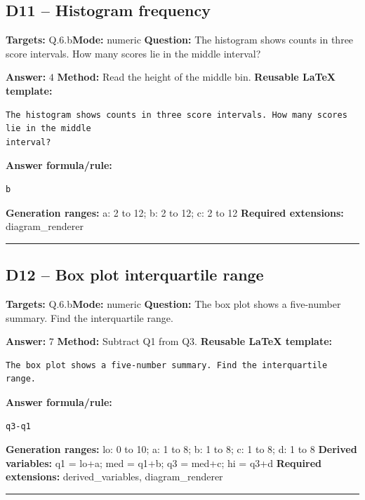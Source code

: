 \documentclass[11pt]{article}
\begin{document}
\subsection{D11 -- Histogram frequency}
\textbf{Targets:} Q.6.b\quad\textbf{Mode:} numeric
\textbf{Question:} The histogram shows counts in three score intervals. How many scores lie in the middle interval?
\begin{center}\end{center}
\textbf{Answer:} \(4\)
\textbf{Method:} Read the height of the middle bin.
\textbf{Reusable LaTeX template:}
\begin{verbatim}
The histogram shows counts in three score intervals. How many scores lie in the middle
interval?
\end{verbatim}
\textbf{Answer formula/rule:}
\begin{verbatim}
b
\end{verbatim}
\textbf{Generation ranges:} a: 2 to 12; b: 2 to 12; c: 2 to 12
\textbf{Required extensions:} diagram\_renderer
\medskip\hrule\medskip
\subsection{D12 -- Box plot interquartile range}
\textbf{Targets:} Q.6.b\quad\textbf{Mode:} numeric
\textbf{Question:} The box plot shows a five-number summary. Find the interquartile range.
\begin{center}\end{center}
\textbf{Answer:} \(7\)
\textbf{Method:} Subtract Q1 from Q3.
\textbf{Reusable LaTeX template:}
\begin{verbatim}
The box plot shows a five-number summary. Find the interquartile range.
\end{verbatim}
\textbf{Answer formula/rule:}
\begin{verbatim}
q3-q1
\end{verbatim}
\textbf{Generation ranges:} lo: 0 to 10; a: 1 to 8; b: 1 to 8; c: 1 to 8; d: 1 to 8
\textbf{Derived variables:} q1 = lo+a; med = q1+b; q3 = med+c; hi = q3+d
\textbf{Required extensions:} derived\_variables, diagram\_renderer
\medskip\hrule\medskip
\end{document}
